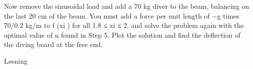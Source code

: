 
%
Now remove the sinusoidal load and add a 70 kg diver to the beam, balancing on the last 20 cm of the beam. You must add a force per unit length of −g times 70/0.2 kg/m to f (xi ) for all 1.8 ≤ xi ≤ 2, and solve the problem again with the optimal value of n found in Step 5. Plot the solution and find the deflection of the diving board at the free end.

\vspace{5mm}
Løsning



%